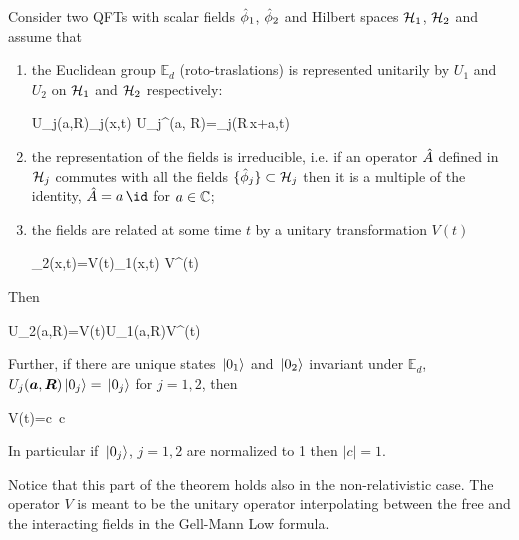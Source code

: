 \documentclass[../main/main.tex]{subfiles}
\begin{document}
\begin{theorem}\label{thm:HHW1}
	Consider two QFTs with scalar fields $\hat{\phi}_1$, $\hat{\phi}_2$ and Hilbert spaces $\mathcal H_1$, $\mathcal H_2$ and assume that
	\begin{enumerate}[label=(\roman*)]
	\item the Euclidean group $\mathbb E_d$ (roto-traslations) is represented unitarily by $U_1$ and $U_2$ on $\mathcal H_1$ and $\mathcal H_2$ respectively:
	\begin{eq}
		U_j(\vec a,\vec R)\ophi_j(\vec x,t) U_j^\dagger(\vec a, \vec R)=\ophi_j(\vec R\,\vec x+\vec a,t)
	\end{eq}
	\item the representation of the fields is irreducible, i.e. if an operator $\hat{A}$ defined in $\mathcal H_j$ commutes with all the fields $\{\hat{\phi}_j\}\subset\mathcal H_j$ then it is a multiple of the identity, $\op A=a\,\id$ for $a\in\mathbb{C}$;
	\item the fields are related at some time $t$ by a unitary transformation $V(t)$
	\begin{eq}\label{eq:HHW-hp-fields}
		\ophi_2(\vec x,t)=V(t)\ophi_1(\vec x,t) V^\dagger(t)
	\end{eq}
	\end{enumerate}
	Then 
	\begin{eq}\label{eq:HHW1_thesis1}
		U_2(\vec a,\vec R)=V(t)U_1(\vec a,\vec R)V^\dagger(t)
	\end{eq}
	Further, if there are unique states $\,\vert0_1\rangle$ and $\,\vert0_2\rangle$ invariant under $\mathbb E_d$, $U_j(\boldsymbol a,\boldsymbol R)\,\vert0_j\rangle=\,\vert0_j\rangle$ for $j=1,2$, then
	\begin{eq}\label{eq:HHW1_thesis2}
		V(t)=c\, \twith c\in\C
	\end{eq}
	In particular if $\,\vert0_j\rangle$, $j=1,2$ are normalized to 1 then $|c|=1$.
\end{theorem}

Notice that this part of the theorem holds also in the non-relativistic case. The operator $V$ is meant to be the unitary operator interpolating between the free and the interacting fields in the Gell-Mann Low formula.
\end{document}
